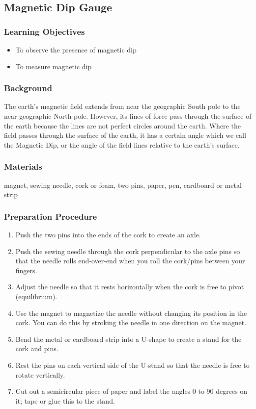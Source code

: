 \subsection{Magnetic Dip Gauge}

\subsubsection*{Learning Objectives}
\begin{itemize}
\item{To observe the presence of magnetic dip}
\item{To measure magnetic dip}
\end{itemize}

\subsubsection*{Background}
The earth's magnetic field extends from near the geographic South pole to the near geographic North pole.  However, its lines of force pass through the surface of the earth because the lines are not perfect circles around the earth.  Where the field passes through the surface of the earth, it has a certain angle which we call the Magnetic Dip, or the angle of the field lines relative to the earth's surface.

\subsubsection*{Materials}
magnet, sewing needle, cork or foam, two pins, paper, pen, cardboard or metal strip

\subsubsection*{Preparation Procedure}
\begin{enumerate}
\item{Push the two pins into the ends of the cork to create an axle.}
\item{Push the sewing needle through the cork perpendicular to the axle pins so that the needle rolls end-over-end when you roll the cork/pins between your fingers.}
\item{Adjust the needle so that it rests horizontally when the cork
is free to pivot (equilibrium).}
\item{Use the magnet to magnetize the needle without changing its position in the cork.  You can do this by stroking the needle in one direction on the magnet.}
\item{Bend the metal or cardboard strip into a U-shape to create a stand for the cork and pins.}
\item{Rest the pins on each vertical side of the U-stand so that the needle is free to rotate vertically.}
\item{Cut out a semicircular piece of paper and label the angles 0 to 90 degrees on it; tape or glue this to the stand.}
\end{enumerate}

